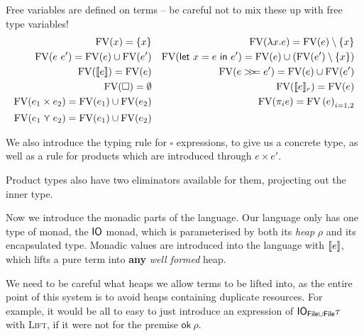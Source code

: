 Free variables are defined on terms -- be careful not to mix these up
with free type variables!
\begin{align*}
  \fv(x) = \{ x \} && \fv(\lambda x . e) = \fv(e) \setminus \{ x \} \\
  \fv(e \ e') = \fv(e) \cup \fv(e') && \fv(\letin{x = e}{e'}) = \fv(e) \cup
                                    (\fv(e') \setminus \{ x \}) \\
  \fv(\lift{e}) = \fv(e) && \fv(e \bind e') = \fv(e) \cup \fv(e') \\
  \fv(\square) = \emptyset && \fv(\use{r}{e}) = \fv(e) \\
  \fv(e_1 \times e_2) = \fv(e_1) \cup \fv(e_2) && \fv(\pi_i e) = \fv{(e)}_{i = 1,
                                          2} \\
  \fv(e_1 \curlyvee e_2) = \fv(e_1) \cup \fv(e_2)
\end{align*}
  
We also introduce the typing rule for $\square$ expressions, to give us a
concrete type, as well as a rule for products which are introduced
through $e \times e'$.
Product types also have two eliminators available for them, projecting
out the inner type.

Now we introduce the monadic parts of the language. Our language only
has one type of monad, the $\IO$ monad, which is parameterised by both
its \textit{heap} $\rho$ and its encapsulated type. Monadic values are
introduced into the language with $\lift{e}$, which lifts a pure term into
\textbf{any} \textit{well formed} heap. 
\begin{mathpar}
\end{mathpar}
We need to be careful what heaps we allow terms to be lifted into, as
the entire point of this system is to avoid heaps containing duplicate
resources. For example, it would be all to easy to just introduce an
expression of $\IO_{\textsf{File} \cup \textsf{File}} \tau$ with
\textsc{Lift}, if it were not for the premise $\textsf{ok} \ \rho$.

